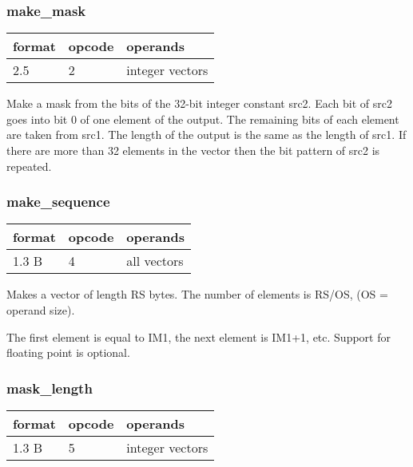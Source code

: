 \documentclass[forwardcom.tex]{subfiles}
\begin{document}
\subsubsection{make\_mask}
\label{table:makeMaskInstruction}
\begin{tabular}{|p{12mm}|p{12mm}|p{110mm}|}
\hline
\bfseries format & \bfseries opcode & \bfseries operands \\ \hline
2.5 &  2 & integer vectors \\ \hline
\end{tabular}
\vspace{2mm}

Make a mask from the bits of the 32-bit integer constant src2. Each bit of src2 goes into bit 0 of one element of the output. The remaining bits of each element are taken from src1. The length of the output is the same as the length of src1. If there are more than 32 elements in the vector then the bit pattern of src2 is repeated.

\subsubsection{make\_sequence}
\label{table:makeSequenceInstruction}
\begin{tabular}{|p{12mm}|p{12mm}|p{110mm}|}
\hline
\bfseries format & \bfseries opcode & \bfseries operands \\ \hline
1.3 B &  4 & all vectors \\ \hline
\end{tabular}
\vspace{2mm}

Makes a vector of length RS bytes. The number of elements is RS/OS, (OS = operand size).

The first element is equal to IM1, the next element is IM1+1, etc.
Support for floating point is optional.

\subsubsection{mask\_length}
\label{table:maskLengthInstruction}
\begin{tabular}{|p{12mm}|p{12mm}|p{110mm}|}
\hline
\bfseries format & \bfseries opcode & \bfseries operands \\ \hline
1.3 B &  5 & integer vectors \\ \hline
\end{tabular}
\vspace{2mm}
\end{document}
